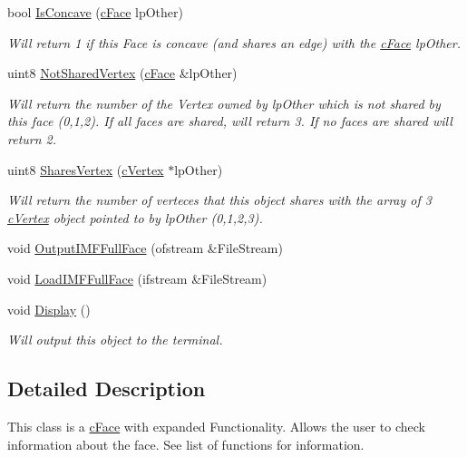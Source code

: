 \begin{DoxyCompactItemize}
bool \hyperlink{classc_full_face_data_ae05debbc355b5c55669e4f836780a7f8}{IsConcave} (\hyperlink{classc_face}{cFace} lpOther)
\begin{DoxyCompactList}\small\item\em Will return 1 if this Face is concave (and shares an edge) with the \hyperlink{classc_face}{cFace} lpOther. \item\end{DoxyCompactList}\item 
uint8 \hyperlink{classc_full_face_data_a625231204c052ebf231c2a1029776c90}{NotSharedVertex} (\hyperlink{classc_face}{cFace} \&lpOther)
\begin{DoxyCompactList}\small\item\em Will return the number of the Vertex owned by lpOther which is not shared by this face (0,1,2). If all faces are shared, will return 3. If no faces are shared will return 2. \item\end{DoxyCompactList}\item 
uint8 \hyperlink{classc_full_face_data_a836ca82086bc8b6301d7536d8aa51a45}{SharesVertex} (\hyperlink{classc_vertex}{cVertex} $\ast$lpOther)
\begin{DoxyCompactList}\small\item\em Will return the number of verteces that this object shares with the array of 3 \hyperlink{classc_vertex}{cVertex} object pointed to by lpOther (0,1,2,3). \item\end{DoxyCompactList}\item 
void \hyperlink{classc_full_face_data_a3792250bc347ccd2dc480bfc36550d3c}{OutputIMFFullFace} (ofstream \&FileStream)
\item 
void \hyperlink{classc_full_face_data_a0c4e4d07909a7896d21b69229cd10ac9}{LoadIMFFullFace} (ifstream \&FileStream)
\item 
void \hyperlink{classc_full_face_data_afc0dbbf171729f20ce08d9cea72f821c}{Display} ()
\begin{DoxyCompactList}\small\item\em Will output this object to the terminal. \item\end{DoxyCompactList}\end{DoxyCompactItemize}


\subsection{Detailed Description}
This class is a \hyperlink{classc_face}{cFace} with expanded Functionality. Allows the user to check information about the face. See list of functions for information. 

